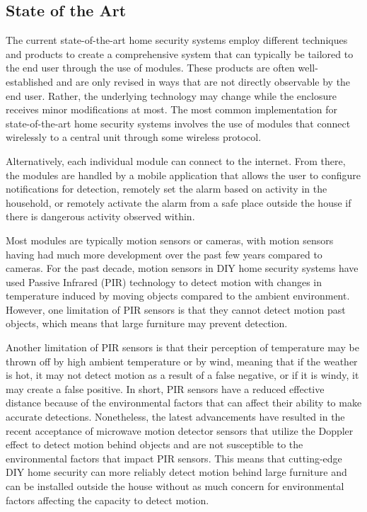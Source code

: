 







\subsection{State of the Art}\label{subsec:state-of-the-art}

The current state-of-the-art home security systems employ different techniques and products
to create a comprehensive system that can typically be tailored to the end user through the
use of modules. These products are often well-established and are only revised in ways that
are not directly observable by the end user. Rather, the underlying technology may change
while the enclosure receives minor modifications at most. \cite{sarhan2020} The most common
implementation for state-of-the-art home security systems involves the use of modules that
connect wirelessly to a central unit through some wireless protocol. \cite{joseMalekian2017}

Alternatively, each individual module can connect to the internet. \cite{sarhan2020} From
there, the modules are handled by a mobile application that allows the user to configure
notifications for detection, remotely set the alarm based on activity in the household, or
remotely activate the alarm from a safe place outside the house if there is dangerous
activity observed within. \cite{joseMalekian2017}

Most modules are typically motion sensors or cameras, with motion sensors having had
much more development over the past few years compared to cameras. For the past decade,
motion sensors in DIY home security systems have used Passive Infrared (PIR) technology to
detect motion with changes in temperature induced by moving objects compared to the ambient
environment. \cite{sarhan2020} However, one limitation of PIR sensors is that they cannot
detect motion past objects, which means that large furniture may prevent detection.

Another limitation of PIR sensors is that their perception of temperature may be thrown off
by high ambient temperature or by wind, meaning that if the weather is hot, it may not detect
motion as a result of a false negative, or if it is windy, it may create a false
positive. In short, PIR sensors have a reduced effective distance because
of the environmental factors that can affect their ability to make accurate detections.
Nonetheless, the latest advancements have resulted in the recent acceptance of microwave
motion detector sensors that utilize the Doppler effect to detect motion behind objects
and are not susceptible to the environmental factors that impact PIR sensors.
\cite{sarhan2020} This means that cutting-edge DIY home security can more reliably detect
motion behind large furniture and can be installed outside the house without as much concern
for environmental factors affecting the capacity to detect motion.


